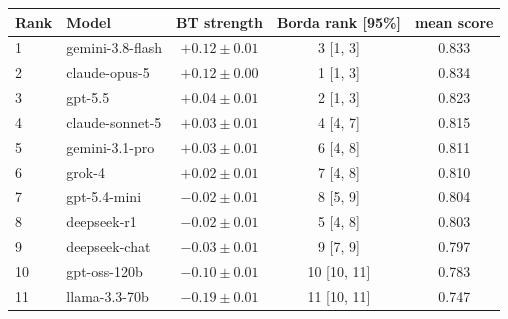 \begin{tabular}{llccc}
\toprule
Rank & Model & BT strength & Borda rank [95\%] & mean score \\
\midrule
1 & gemini-3.8-flash & $+0.12 \pm 0.01$ & 3 [1, 3] & 0.833 \\
2 & claude-opus-5 & $+0.12 \pm 0.00$ & 1 [1, 3] & 0.834 \\
3 & gpt-5.5 & $+0.04 \pm 0.01$ & 2 [1, 3] & 0.823 \\
4 & claude-sonnet-5 & $+0.03 \pm 0.01$ & 4 [4, 7] & 0.815 \\
5 & gemini-3.1-pro & $+0.03 \pm 0.01$ & 6 [4, 8] & 0.811 \\
6 & grok-4 & $+0.02 \pm 0.01$ & 7 [4, 8] & 0.810 \\
7 & gpt-5.4-mini & $-0.02 \pm 0.01$ & 8 [5, 9] & 0.804 \\
8 & deepseek-r1 & $-0.02 \pm 0.01$ & 5 [4, 8] & 0.803 \\
9 & deepseek-chat & $-0.03 \pm 0.01$ & 9 [7, 9] & 0.797 \\
10 & gpt-oss-120b & $-0.10 \pm 0.01$ & 10 [10, 11] & 0.783 \\
11 & llama-3.3-70b & $-0.19 \pm 0.01$ & 11 [10, 11] & 0.747 \\
\bottomrule
\end{tabular}

